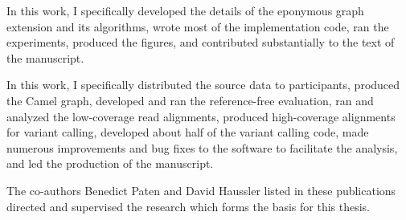 \begin{frontmatter}
\begin{acknowledgements}
{In this work, I specifically developed the details of the eponymous graph extension and its algorithms, wrote most of the implementation code, ran the experiments, produced the figures, and contributed substantially to the text of the manuscript.

\begin{singlespace}
\noindent
{}
\end{singlespace}

}

In this work, I specifically distributed the source data to participants, produced the Camel graph, developed and ran the reference-free evaluation, ran and analyzed the low-coverage read alignments, produced high-coverage alignments for variant calling, developed about half of the variant calling code, made numerous improvements and bug fixes to the \vg software to facilitate the analysis, and led the production of the manuscript.

The co-authors Benedict Paten and David Haussler listed in these publications directed and supervised the research which forms the basis for this thesis.
\end{acknowledgements}

\end{frontmatter}
